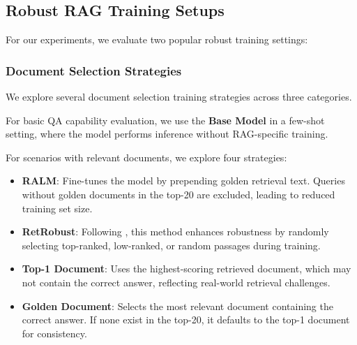 
\subsection{Robust RAG Training Setups}
For our experiments, we evaluate two popular robust training settings:
\subsubsection{Document Selection Strategies}
We explore several document selection training strategies across three categories.

For basic QA capability evaluation, we use the \textbf{Base Model} in a few-shot setting, where the model performs inference without RAG-specific training.

For scenarios with relevant documents, we explore four strategies:
\begin{itemize}[leftmargin=0.5cm, itemindent=0cm, itemsep=0pt]
    \item \textbf{RALM}: Fine-tunes the model by prepending golden retrieval text. Queries without golden documents in the top-20 are excluded, leading to reduced training set size.
    \item \textbf{RetRobust}: Following , this method enhances robustness by randomly selecting top-ranked, low-ranked, or random passages during training.
    \item \textbf{Top-1 Document}: Uses the highest-scoring retrieved document, which may not contain the correct answer, reflecting real-world retrieval challenges.
    \item \textbf{Golden Document}: Selects the most relevant document containing the correct answer. If none exist in the top-20, it defaults to the top-1 document for consistency.
\end{itemize}

